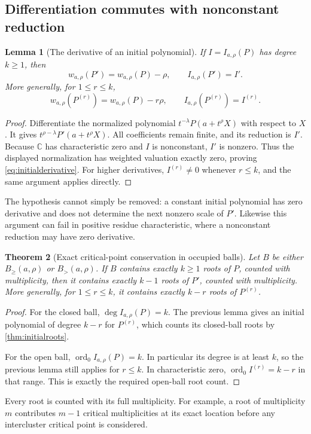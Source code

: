 \documentclass[11pt,letterpaper]{article}
\numberwithin{equation}{section}
\newtheorem{theorem}{Theorem}[section]
\newtheorem{lemma}[theorem]{Lemma}
\theoremstyle{definition}
\theoremstyle{remark}\newtheorem{remark}[theorem]{Remark}
\newcommand{\C}{\mathbb C}
\newcommand{\ord}{\operatorname{ord}}
\newcommand{\Bge}[2]{B_{\ge}(#1,#2)}
\newcommand{\Bgt}[2]{B_{>}(#1,#2)}
\begin{document}
\subsection{Differentiation commutes with nonconstant reduction}
\begin{lemma}[The derivative of an initial polynomial]\label{lem:initialderivative}
If $I=I_{a,\rho}(P)$ has degree $k\ge1$, then
\begin{equation}\label{eq:initialderivative}
 w_{a,\rho}(P')=w_{a,\rho}(P)-\rho,\qquad
 I_{a,\rho}(P')=I'.
\end{equation}
More generally, for $1\le r\le k$,
\[
 w_{a,\rho}(P^{(r)})=w_{a,\rho}(P)-r\rho,\qquad
 I_{a,\rho}(P^{(r)})=I^{(r)}.
\]
\end{lemma}
\begin{proof}
Differentiate the normalized polynomial
$t^{-\lambda}P(a+t^\rho X)$ with respect to $X$. It gives
$t^{\rho-\lambda}P'(a+t^\rho X)$. All coefficients remain finite, and
its reduction is $I'$. Because $\C$ has characteristic zero and $I$
is nonconstant, $I'$ is nonzero. Thus the displayed normalization has
weighted valuation exactly zero, proving \eqref{eq:initialderivative}.
For higher derivatives, $I^{(r)}\ne0$ whenever $r\le k$, and the same
argument applies directly.
\end{proof}
The hypothesis cannot simply be removed: a constant initial polynomial
has zero derivative and does not determine the next nonzero scale of
$P'$. Likewise this argument can fail in positive residue
characteristic, where a nonconstant reduction may have zero derivative.

\begin{theorem}[Exact critical-point conservation in occupied balls]
\label{thm:criticalballs}
Let $B$ be either $\Bge a\rho$ or $\Bgt a\rho$. If $B$ contains
exactly $k\ge1$ roots of $P$, counted with multiplicity, then it contains
exactly $k-1$ roots of $P'$, counted with multiplicity. More generally,
for $1\le r\le k$, it contains exactly $k-r$ roots of $P^{(r)}$.
\end{theorem}
\begin{proof}
For the closed ball, $\deg I_{a,\rho}(P)=k$. The previous lemma gives
an initial polynomial of degree $k-r$ for $P^{(r)}$, which counts its
closed-ball roots by \cref{thm:initialroots}.

For the open ball, $\ord_0 I_{a,\rho}(P)=k$. In particular its degree
is at least $k$, so the previous lemma still applies for $r\le k$.
In characteristic zero, $\ord_0 I^{(r)}=k-r$ in that range. This is
exactly the required open-ball root count.
\end{proof}
Every root is counted with its full multiplicity. For example, a root
of multiplicity $m$ contributes $m-1$ critical multiplicities at its
exact location before any intercluster critical point is considered.
\end{document}
